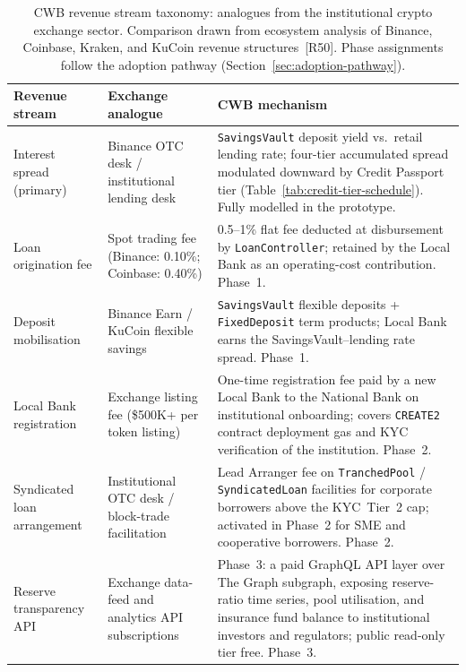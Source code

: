 \begin{table}[H]
\centering
\caption{CWB revenue stream taxonomy: analogues from the institutional crypto
exchange sector. Comparison drawn from ecosystem analysis of Binance, Coinbase,
Kraken, and KuCoin revenue structures~[R50]. Phase assignments follow the
adoption pathway (Section~\ref{sec:adoption-pathway}).}
\label{tab:revenue-streams}
\small
\renewcommand{\arraystretch}{1.3}
\begin{tabular}{p{3.5cm}p{3.2cm}p{5.2cm}}
\hline
\textbf{Revenue stream} & \textbf{Exchange analogue} & \textbf{CWB mechanism} \\
\hline
Interest spread (primary) &
  Binance OTC desk / institutional lending desk &
  \texttt{SavingsVault} deposit yield vs.\ retail lending rate; four-tier
  accumulated spread modulated downward by Credit Passport tier
  (Table~\ref{tab:credit-tier-schedule}). Fully modelled in the
  prototype. \\
Loan origination fee &
  Spot trading fee (Binance: 0.10\%; Coinbase: 0.40\%) &
  0.5--1\% flat fee deducted at disbursement by
  \texttt{LoanController}; retained by the Local Bank as an
  operating-cost contribution. Phase~1. \\
Deposit mobilisation &
  Binance Earn / KuCoin flexible savings &
  \texttt{SavingsVault} flexible deposits + \texttt{FixedDeposit}
  term products; Local Bank earns the SavingsVault--lending rate
  spread. Phase~1. \\
Local Bank registration &
  Exchange listing fee (\$500K+ per token listing) &
  One-time registration fee paid by a new Local Bank to the National
  Bank on institutional onboarding; covers \texttt{CREATE2} contract
  deployment gas and KYC verification of the institution. Phase~2. \\
Syndicated loan arrangement &
  Institutional OTC desk / block-trade facilitation &
  Lead Arranger fee on \texttt{TranchedPool} /
  \texttt{SyndicatedLoan} facilities for corporate borrowers above the
  KYC~Tier~2 cap; activated in Phase~2 for SME and cooperative
  borrowers. Phase~2. \\
Reserve transparency API &
  Exchange data-feed and analytics API subscriptions &
  Phase~3: a paid GraphQL API layer over The Graph subgraph,
  exposing reserve-ratio time series, pool utilisation, and insurance
  fund balance to institutional investors and regulators; public
  read-only tier free. Phase~3. \\
\hline
\end{tabular}
\end{table}

